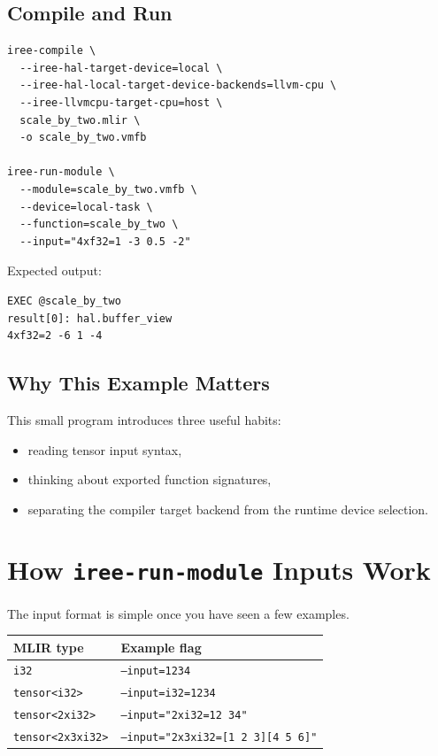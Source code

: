 \documentclass[11pt,a4paper]{article}
\begin{document}
\subsection{Compile and Run}

\begin{lstlisting}[caption=Compile and execute the vector example]
iree-compile \
  --iree-hal-target-device=local \
  --iree-hal-local-target-device-backends=llvm-cpu \
  --iree-llvmcpu-target-cpu=host \
  scale_by_two.mlir \
  -o scale_by_two.vmfb

iree-run-module \
  --module=scale_by_two.vmfb \
  --device=local-task \
  --function=scale_by_two \
  --input="4xf32=1 -3 0.5 -2"
\end{lstlisting}

Expected output:

\begin{lstlisting}[caption=Expected output]
EXEC @scale_by_two
result[0]: hal.buffer_view
4xf32=2 -6 1 -4
\end{lstlisting}

\subsection{Why This Example Matters}

This small program introduces three useful habits:
\begin{itemize}
    \item reading tensor input syntax,
    \item thinking about exported function signatures,
    \item separating the compiler target backend from the runtime device selection.
\end{itemize}

\section{How \texttt{iree-run-module} Inputs Work}

The input format is simple once you have seen a few examples.

\begin{tabular}{|l|p{8cm}|}
\hline
\textbf{MLIR type} & \textbf{Example flag} \\
\hline
\texttt{i32} & \texttt{--input=1234} \\
\hline
\texttt{tensor<i32>} & \texttt{--input=i32=1234} \\
\hline
\texttt{tensor<2xi32>} & \texttt{--input="2xi32=12 34"} \\
\hline
\texttt{tensor<2x3xi32>} & \texttt{--input="2x3xi32=[1 2 3][4 5 6]"} \\
\hline
\end{tabular}
\end{document}
